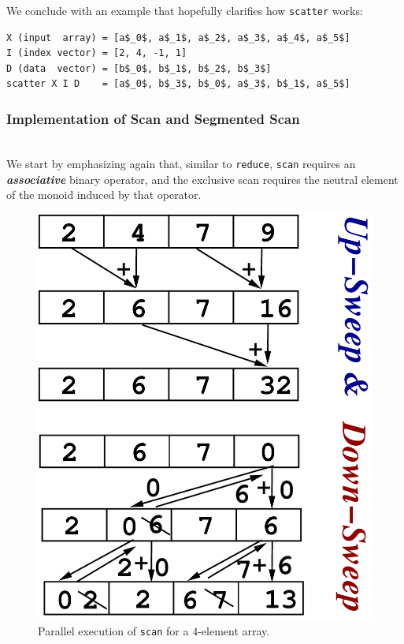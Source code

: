\documentclass[acmsmall,review]{acmart}\settopmatter{printfolios=true,printccs=false,printacmref=false}
\begin{document}
We conclude with an example that hopefully clarifies how 
\lstinline{scatter} works:
\begin{lstlisting}[mathescape=true]
X (input  array) = [a$_0$, a$_1$, a$_2$, a$_3$, a$_4$, a$_5$]
I (index vector) = [2, 4, -1, 1]
D (data  vector) = [b$_0$, b$_1$, b$_2$, b$_3$]
scatter X I D    = [a$_0$, b$_3$, b$_0$, a$_3$, b$_1$, a$_5$]
\end{lstlisting}\vspace{-2ex}


\subsubsection{Implementation of Scan and Segmented Scan}
\label{subsubsub:scan-impl}
$\mbox{ }$\\

We start by emphasizing again that, similar to \lstinline{reduce},
\lstinline{scan} requires an \emph{\bf associative} binary operator,
and the exclusive scan requires the neutral element of the monoid 
induced by that operator.

\begin{figure}
\includegraphics[height=33ex]{Figures/L2/ScanEg.pdf} 
\caption{Parallel execution of \lstinline{scan} for a $4$-element array.}
\label{fig:scan-eg}
\end{figure} 
\end{document}

